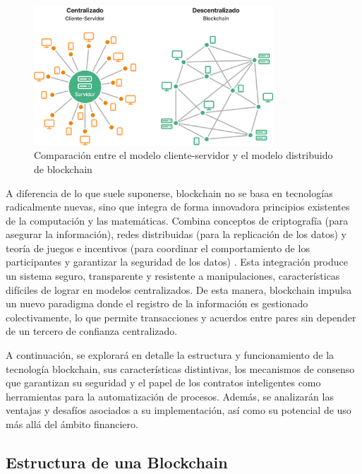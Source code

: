 \begin{figure}[!tb] 
    \centering
    \includegraphics[width=0.8\textwidth]{Figures/client-server-vs-p2p.png}
    \caption{Comparación entre el modelo cliente-servidor y el modelo distribuido de blockchain}
    \label{fig:web-architecture}
\end{figure}

A diferencia de lo que suele suponerse, blockchain no se basa en tecnologías radicalmente nuevas, sino que integra de forma innovadora principios existentes de la computación y las matemáticas. Combina conceptos de criptografía (para asegurar la información), redes distribuidas (para la replicación de los datos) y teoría de juegos e incentivos (para coordinar el comportamiento de los participantes y garantizar la seguridad de los datos) \cite{sunny2022systematic, bulkowska2023implementation}. Esta integración produce un sistema seguro, transparente y resistente a manipulaciones, características difíciles de lograr en modelos centralizados. De esta manera, blockchain impulsa un nuevo paradigma donde el registro de la información es gestionado colectivamente, lo que permite transacciones y acuerdos entre pares sin depender de un tercero de confianza centralizado.

A continuación, se explorará en detalle la estructura y funcionamiento de la tecnología blockchain, sus características distintivas, los mecanismos de consenso que garantizan su seguridad y el papel de los contratos inteligentes como herramientas para la automatización de procesos. Además, se analizarán las ventajas y desafíos asociados a su implementación, así como su potencial de uso más allá del ámbito financiero.

\subsection{Estructura de una Blockchain}

